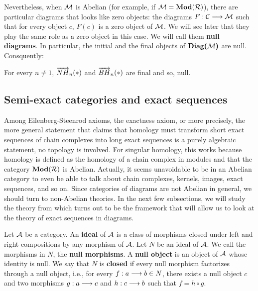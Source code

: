	Nevertheless, when $\mathcal{M}$ is Abelian (for example, if $\mathcal{M} = \textbf{Mod}(\mathcal{R})$), there are particular diagrams that looks like zero objects: the diagrams $F : \mathcal{C} \longrightarrow \mathcal{M}$ such that for every object $c$, $F(c)$ is a zero object of $\mathcal{M}$. We will see later that they play the same role as a zero object in this case. We will call them \textbf{null diagrams}. In particular, the initial and the final objects of $\textbf{Diag(}\mathcal{M}\textbf{)}$ are null. Consquently:
	
	\begin{prop}
	For every $n \neq 1$, $\overrightarrow{NH}_{n}(\ast)$ and $\overrightarrow{BH}_{n}(\ast)$ are final and so, null.
	\end{prop}
	
	
	
	\subsection{Semi-exact categories and exact sequences}
	
	Among Eilenberg-Steenrod axioms, the exactness axiom, or more precisely, the more general statement that claims that homology must transform short exact sequences of chain complexes into long exact sequences is a purely algebraic statement, no topology is involved. For singular homology, this works because homology is defined as the homology of a chain complex in modules and that the category $\textbf{Mod}(\mathcal{R})$ is Abelian. Actually, it seems unavoidable to be in an Abelian category to even be able to talk about chain complexes, kernels, images, exact sequences, and so on. Since categories of diagrams are not Abelian in general, we should turn to non-Abelian theories. In the next few subsections, we will study the theory from \cite{grandis91,grandis91b} which turns out to be the framework that will allow us to look at the theory of exact sequences in diagrams.
	
	Let $\mathcal{A}$ be a category. An \textbf{ideal} of $\mathcal{A}$ is a class of morphisms closed under left and right compositions by any morphism of $\mathcal{A}$. Let $N$ be an ideal of $\mathcal{A}$. We call the morphisms in $N$, the \textbf{null morphisms}. A \textbf{null object} is an object of $\mathcal{A}$ whose identity is null. We say that $N$ is \textbf{closed} if every null morphism factorizes through a null object, i.e., for every $f : a \longrightarrow b \in N$, there exists a null object $c$ and two morphisms $g : a \longrightarrow c$ and $h : c \longrightarrow b$ such that $f = h \circ g$.
	
